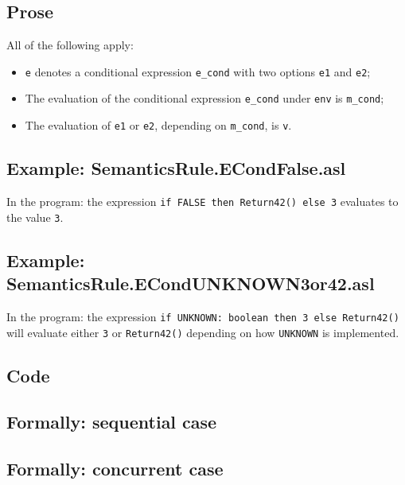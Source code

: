 \documentclass{book}
\begin{document}
  \subsection{Prose}
  All of the following apply:
  \begin{itemize}
  \item \texttt{e} denotes a conditional expression \texttt{e\_cond} with two options \texttt{e1} and \texttt{e2};
  \item The evaluation of the conditional expression \texttt{e\_cond} under \texttt{env} is \texttt{m\_cond};
  \item The evaluation of \texttt{e1} or \texttt{e2}, depending on \texttt{m\_cond}, is \texttt{v}.
  \end{itemize}

  \subsection{Example: SemanticsRule.ECondFalse.asl}
    In the program:
    the expression \texttt{if FALSE then Return42() else 3} evaluates to the value \texttt{3}.

  \subsection{Example: SemanticsRule.ECondUNKNOWN3or42.asl}
    In the program:
the expression \texttt{if UNKNOWN: boolean then 3 else Return42()} will
evaluate either \texttt{3} or \texttt{Return42()} depending on how
\texttt{UNKNOWN} is implemented.

  \subsection{Code}

\begin{emptyformal}
  \subsection{Formally: sequential case}

  \subsection{Formally: concurrent case}
\end{emptyformal}
\end{document}

